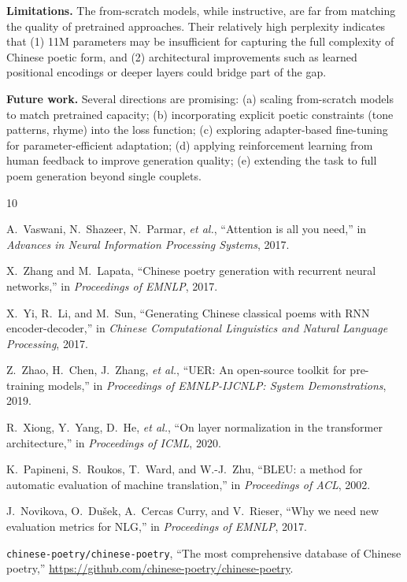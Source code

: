 \documentclass[11pt,a4paper]{article}
\begin{document}
\textbf{Limitations.}
The from-scratch models, while instructive, are far from matching the quality
of pretrained approaches.
Their relatively high perplexity indicates that
(1) 11M parameters may be insufficient for capturing the full complexity of
Chinese poetic form, and
(2) architectural improvements such as learned positional encodings or deeper
layers could bridge part of the gap.

\textbf{Future work.}
Several directions are promising:
(a) scaling from-scratch models to match pretrained capacity;
(b) incorporating explicit poetic constraints (tone patterns, rhyme) into the
loss function;
(c) exploring adapter-based fine-tuning for parameter-efficient adaptation;
(d) applying reinforcement learning from human feedback to improve generation
quality;
(e) extending the task to full poem generation beyond single couplets.

\begin{thebibliography}{10}

A.~Vaswani, N.~Shazeer, N.~Parmar, \emph{et al.},
``Attention is all you need,''
in \emph{Advances in Neural Information Processing Systems}, 2017.

X.~Zhang and M.~Lapata,
``Chinese poetry generation with recurrent neural networks,''
in \emph{Proceedings of EMNLP}, 2017.

X.~Yi, R.~Li, and M.~Sun,
``Generating Chinese classical poems with RNN encoder-decoder,''
in \emph{Chinese Computational Linguistics and Natural Language Processing}, 2017.

Z.~Zhao, H.~Chen, J.~Zhang, \emph{et al.},
``UER: An open-source toolkit for pre-training models,''
in \emph{Proceedings of EMNLP-IJCNLP: System Demonstrations}, 2019.

R.~Xiong, Y.~Yang, D.~He, \emph{et al.},
``On layer normalization in the transformer architecture,''
in \emph{Proceedings of ICML}, 2020.

K.~Papineni, S.~Roukos, T.~Ward, and W.-J.~Zhu,
``BLEU: a method for automatic evaluation of machine translation,''
in \emph{Proceedings of ACL}, 2002.

J.~Novikova, O.~Dušek, A.~Cercas Curry, and V.~Rieser,
``Why we need new evaluation metrics for NLG,''
in \emph{Proceedings of EMNLP}, 2017.

\texttt{chinese-poetry/chinese-poetry},
``The most comprehensive database of Chinese poetry,''
\url{https://github.com/chinese-poetry/chinese-poetry}.

\end{thebibliography}
\end{document}
